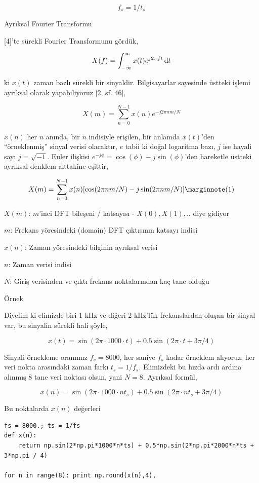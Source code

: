 \documentclass[12pt,fleqn]{article}\usepackage{../../common}
\begin{document}
$$ f_s = 1 / t_s$$

Ayrıksal Fourier Transformu

[4]'te sürekli Fourier Transformunu gördük,

$$ X(f) = \int_{-\infty}^{\infty} x(t) e^{j2\pi ft} \,\mathrm{d} t $$

ki $x(t)$ zaman bazlı sürekli bir sinyaldir. Bilgisayarlar sayesinde
üstteki işlemi ayrıksal olarak yapabiliyoruz [2, sf. 46], 

$$ X(m) = \sum_{n=0}^{N-1} x(n) e^{-j2\pi nm / N} $$

$x(n)$ her $n$ anında, bir $n$ indisiyle erişilen, bir anlamda $x(t)$'den
``örneklenmiş'' sinyal verisi olacaktır, $e$ tabii ki doğal logaritma bazı,
$j$ ise hayali sayı $j = \sqrt{-1}$.  Euler ilişkisi $e^{-j\phi} =
\cos(\phi) - j\sin(\phi)$'den 
hareketle üstteki ayrıksal denklem alttakine eşittir,

$$ X(m) = \sum_{n=0}^{N-1} x(n) [ \cos(2\pi nm / N) - j \sin(2\pi nm / N)] 
\mlabel{1}
$$

$X(m)$: $m$'inci DFT bileşeni / katsayısı - $X(0),X(1),..$ diye gidiyor

$m$: Frekans yöresindeki (domain) DFT çıktısının katsayı indisi

$x(n)$: Zaman yöresindeki bilginin ayrıksal verisi

$n$: Zaman verisi indisi

$N$: Giriş verisinden ve çıktı frekans noktalarından kaç tane olduğu

Örnek

Diyelim ki elimizde biri 1 kHz ve diğeri 2 kHz'lük frekanslardan oluşan bir
sinyal var, bu sinyalin sürekli hali şöyle,

$$ x(t) = \sin(2\pi \cdot 1000 \cdot t) + 0.5 \sin (2\pi \cdot t + 3\pi/4)$$

Sinyali örnekleme oranımız $f_s = 8000$, her saniye $f_s$ kadar örneklem
alıyoruz, her veri nokta arasındaki zaman farkı $t_s = 1/f_s$. Elimizdeki
bu hızda ardı ardına alınmış 8 tane veri noktası olsun, yani
$N=8$. Ayrıksal formül,

$$ x(n) = \sin(2\pi \cdot 1000 \cdot nt_s) + 0.5 \sin (2\pi \cdot nt_s + 3\pi/4) $$

Bu noktalarda $x(n)$ değerleri

\begin{verbatim}
fs = 8000.; ts = 1/fs
def x(n):
    return np.sin(2*np.pi*1000*n*ts) + 0.5*np.sin(2*np.pi*2000*n*ts + 3*np.pi / 4)

for n in range(8): print np.round(x(n),4),
\end{verbatim}
\end{document}
